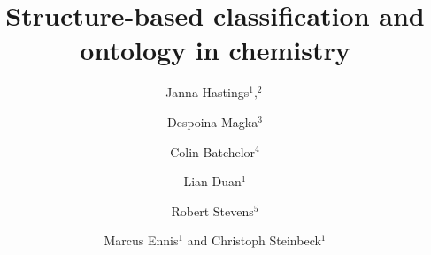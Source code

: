 \documentclass[10pt]{bmc_article}
\newenvironment{bmcformat}{\baselineskip20pt\sloppy\setboolean{publ}{false}}{\baselineskip20pt\sloppy}
\begin{document}
\begin{bmcformat}
 
 


\title{Structure-based classification and ontology in chemistry}
 


\author{Janna Hastings\correspondingauthor$^1,^2$%
       \and 
         Despoina Magka$^3$%
       \and
	     	 Colin Batchelor$^4$  %
       \and 
         Lian Duan$^1$%
       \and 
         Robert Stevens$^5$  %
       \and 
         Marcus Ennis$^1$ %
       and 
       	 Christoph Steinbeck$^1$%
      }
      


\address{%
    \iid(1)Chemoinformatics and Metabolism, European Bioinformatics Institute, Hinxton, UK\\
    \iid(2)Swiss Center for Affective Sciences, University of Geneva, Switzerland\\
    \iid(3)Department of Computer Science, University of Oxford, UK\\
    \iid(4)Royal Society of Chemistry, Cambridge, UK\\
    \iid(5)Manchester University, UK%
}%


\end{bmcformat}
\end{document}
